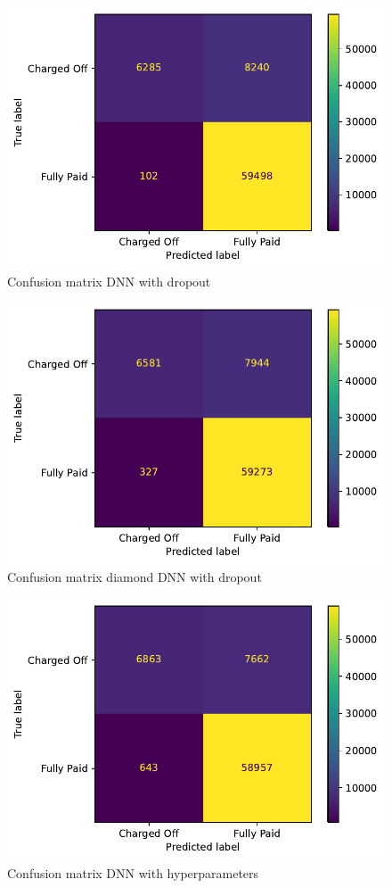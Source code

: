 \documentclass[french]{scrartcl}
\begin{document}
	\begin{figure}[h!]
	\centering
	\includegraphics[scale=0.8]{figures/(8)confusion_matrix_dropout_neural_network.pdf}
    \caption{Confusion matrix DNN with dropout}
\end{figure}
	\begin{figure}[h!]
	\centering
	\includegraphics[scale=0.8]{figures/(9)confusion_matrix_dropout_diamond_neural_network.pdf}
	\caption{Confusion matrix diamond DNN with dropout}
\end{figure}
	\begin{figure}[h!]
	\centering
	\includegraphics[scale=0.8]{figures/(10)confusion_matrix_hyper_neural_network.pdf}
	\caption{Confusion matrix DNN with hyperparameters}
\end{figure}
\end{document}
